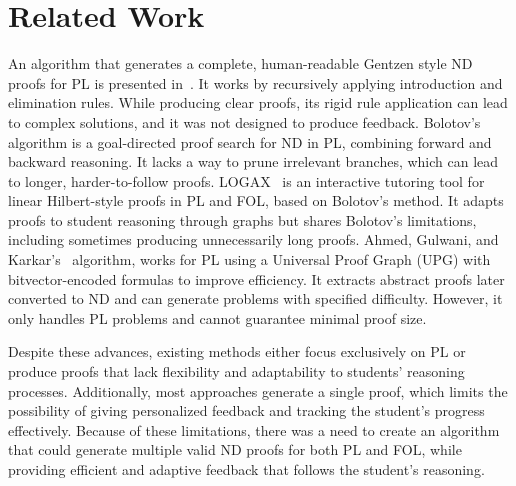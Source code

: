 \section{Related Work}
An algorithm that generates a complete, human-readable Gentzen style ND proofs for PL is presented in~\cite{makahu_automatic}. It works by recursively applying introduction and elimination rules. While producing clear proofs, its rigid rule application can lead to complex solutions, and it was not designed to produce feedback. Bolotov’s~\cite{bolotov_2005_automated} algorithm is a goal-directed proof search for ND in PL, combining forward and backward reasoning. It lacks a way to prune irrelevant branches, which can lead to longer, harder-to-follow proofs. LOGAX~\cite{lodder_2020_generation} is an interactive tutoring tool for linear Hilbert-style proofs in PL and FOL, based on Bolotov’s method. It adapts proofs to student reasoning through graphs but shares Bolotov’s limitations, including sometimes producing unnecessarily long proofs. Ahmed, Gulwani, and Karkar’s~\cite{IJCAI13} algorithm, works for PL using a Universal Proof Graph (UPG) with bitvector-encoded formulas to improve efficiency. It extracts abstract proofs later converted to ND and can generate problems with specified difficulty. However, it only handles PL problems and cannot guarantee minimal proof size.

Despite these advances, existing methods either focus exclusively on PL or produce proofs that lack flexibility and adaptability to students’ reasoning processes. Additionally, most approaches generate a single proof, which limits the possibility of giving personalized feedback and tracking the student’s progress effectively. Because of these limitations, there was a need to create an algorithm that could generate multiple valid ND proofs for both PL and FOL, while providing efficient and adaptive feedback that follows the student’s reasoning.


